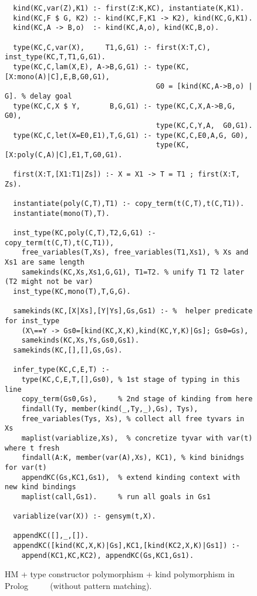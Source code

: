 \documentclass[runningheads,a4paper]{llncs}
\begin{document}
\begin{figure}
\begin{verbatim}
  kind(KC,var(Z),K1) :- first(Z:K,KC), instantiate(K,K1).
  kind(KC,F $ G, K2) :- kind(KC,F,K1 -> K2), kind(KC,G,K1).
  kind(KC,A -> B,o)  :- kind(KC,A,o), kind(KC,B,o).

  type(KC,C,var(X),     T1,G,G1) :- first(X:T,C), inst_type(KC,T,T1,G,G1).
  type(KC,C,lam(X,E), A->B,G,G1) :- type(KC,[X:mono(A)|C],E,B,G0,G1),
                                    G0 = [kind(KC,A->B,o) | G]. % delay goal
  type(KC,C,X $ Y,       B,G,G1) :- type(KC,C,X,A->B,G, G0),
                                    type(KC,C,Y,A,  G0,G1).
  type(KC,C,let(X=E0,E1),T,G,G1) :- type(KC,C,E0,A,G, G0),
                                    type(KC,[X:poly(C,A)|C],E1,T,G0,G1).
  
  first(X:T,[X1:T1|Zs]) :- X = X1 -> T = T1 ; first(X:T, Zs).
  
  instantiate(poly(C,T),T1) :- copy_term(t(C,T),t(C,T1)).
  instantiate(mono(T),T).
  
  inst_type(KC,poly(C,T),T2,G,G1) :- copy_term(t(C,T),t(C,T1)), 
    free_variables(T,Xs), free_variables(T1,Xs1), % Xs and Xs1 are same length
    samekinds(KC,Xs,Xs1,G,G1), T1=T2. % unify T1 T2 later (T2 might not be var)
  inst_type(KC,mono(T),T,G,G).
  
  samekinds(KC,[X|Xs],[Y|Ys],Gs,Gs1) :- %  helper predicate for inst_type
    (X\==Y -> Gs0=[kind(KC,X,K),kind(KC,Y,K)|Gs]; Gs0=Gs),
    samekinds(KC,Xs,Ys,Gs0,Gs1).
  samekinds(KC,[],[],Gs,Gs).

  infer_type(KC,C,E,T) :-
    type(KC,C,E,T,[],Gs0), % 1st stage of typing in this line
    copy_term(Gs0,Gs),     % 2nd stage of kinding from here
    findall(Ty, member(kind(_,Ty,_),Gs), Tys),
    free_variables(Tys, Xs), % collect all free tyvars in Xs
    maplist(variablize,Xs),  % concretize tyvar with var(t) where t fresh
    findall(A:K, member(var(A),Xs), KC1), % kind binidngs for var(t)
    appendKC(Gs,KC1,Gs1),  % extend kinding context with new kind bindings
    maplist(call,Gs1).     % run all goals in Gs1
  
  variablize(var(X)) :- gensym(t,X).

  appendKC([],_,[]).
  appendKC([kind(KC,X,K)|Gs],KC1,[kind(KC2,X,K)|Gs1]) :-
    append(KC1,KC,KC2), appendKC(Gs,KC1,Gs1).
\end{verbatim}
\caption{HM + type constructor polymorphism + kind polymorphism in Prolog
        $\qquad$
        (without pattern matching).}
\label{fig:HMtck}
\end{figure}
\end{document}
